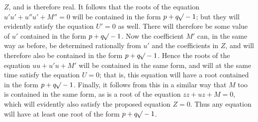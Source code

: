 $Z$, and is therefore real. It follows that the roots of the equation $u'u'+u''u'+M''=0$ will be contained in the form $p+q\mathord{{}^{}\!\surd}-1$; but they will evidently satisfy the equation $U'=0$ as well. There will therefore be some value of $u'$ contained in the form $p+q\mathord{{}^{}\!\surd}-1$. Now the coefficient $M'$ can, in the same way as before, be determined rationally from $u'$ and the coefficients in $Z$, and will therefore also be contained in the form $p+q\mathord{{}^{}\!\surd}-1$. Hence the roots of the equation $uu+u'u+M'$ will be contained in the same form, and will at the same time satisfy the equation $U=0$; that is, this equation will have a root contained in the form $p+q\mathord{{}^{}\!\surd}-1$. Finally, it follows from this in a similar way that $M$ too is contained in the same form, as is a root of the equation $zz+uz+M=0$, which will evidently also satisfy the proposed equation $Z=0$. Thus any equation will have at least one root of the form $p+q\mathord{{}^{}\!\surd}-1$.

